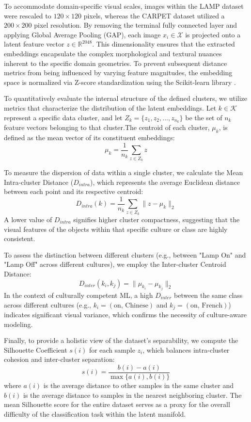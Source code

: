 To accommodate domain-specific visual scales, images within the LAMP dataset were rescaled to $120 \times 120$ pixels, whereas the CARPET dataset utilized a $200 \times 200$ pixel resolution. By removing the terminal fully connected layer and applying Global Average Pooling (GAP), each image $x_i \in \mathcal{X}$ is projected onto a latent feature vector $z \in \mathbb{R}^{2048}$. This dimensionality ensures that the extracted embeddings encapsulate the complex morphological and textural nuances inherent to the specific domain geometries. To prevent subsequent distance metrics from being influenced by varying feature magnitudes, the embedding space is normalized via Z-score standardization using the Scikit-learn library \citep{pedregosa2011scikit}. 

To quantitatively evaluate the internal structure of the defined clusters, we utilize metrics that characterize the distribution of the latent embeddings. Let $k \in \mathcal{K}$ represent a specific data cluster, and let $Z_k = \{z_{1}, z_{2}, \dots, z_{n_k}\}$ be the set of $n_k$ feature vectors belonging to that cluster.The centroid of each cluster, $\mu_k$, is defined as the mean vector of its constituent embeddings:$$\mu_k = \frac{1}{n_k} \sum_{z \in Z_k} z$$

To measure the dispersion of data within a single cluster, we calculate the Mean Intra-cluster Distance ($D_{intra}$), which represents the average Euclidean distance between each point and its respective centroid:$$D_{intra}(k) = \frac{1}{n_k} \sum_{z \in Z_k} \|z - \mu_k\|_2$$A lower value of $D_{intra}$ signifies higher cluster compactness, suggesting that the visual features of the objects within that specific culture or class are highly consistent.

To assess the distinction between different clusters (e.g., between "Lamp On" and "Lamp Off" across different cultures), we employ the Inter-cluster Centroid Distance:$$D_{inter}(k_i, k_j) = \|\mu_{k_i} - \mu_{k_j}\|_2$$In the context of culturally competent ML, a high $D_{inter}$ between the same class across different cultures (e.g., $k_i = (\text{on, Chinese})$ and $k_j = (\text{on, French})$) indicates significant visual variance, which confirms the necessity of culture-aware modeling.

Finally, to provide a holistic view of the dataset's separability, we compute the Silhouette Coefficient $s(i)$ for each sample $z_i$, which balances intra-cluster cohesion and inter-cluster separation:$$s(i) = \frac{b(i) - a(i)}{\max\{a(i), b(i)\}}$$where $a(i)$ is the average distance to other samples in the same cluster and $b(i)$ is the average distance to samples in the nearest neighboring cluster. 
The mean Silhouette score for the entire dataset serves as a proxy for the overall difficulty of the classification task within the latent manifold.

